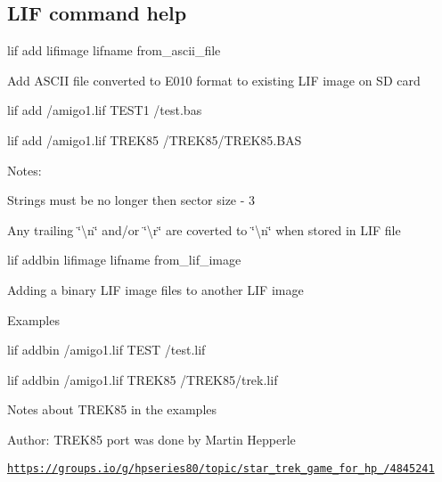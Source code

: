 \subsection*{L\+IF command help}


\begin{DoxyItemize}
\item lif add lifimage lifname from\+\_\+ascii\+\_\+file
\begin{DoxyItemize}
\item Add A\+S\+C\+II file converted to E010 format to existing L\+IF image on SD card
\begin{DoxyItemize}
\item lif add /amigo1.lif T\+E\+S\+T1 /test.bas
\item lif add /amigo1.lif T\+R\+E\+K85 /\+T\+R\+E\+K85/\+T\+R\+E\+K85.B\+AS
\end{DoxyItemize}
\item Notes\+:
\begin{DoxyItemize}
\item Strings must be no longer then sector size -\/ 3
\item Any trailing \char`\"{}\textbackslash{}n\char`\"{} and/or \char`\"{}\textbackslash{}r\char`\"{} are coverted to \char`\"{}\textbackslash{}n\char`\"{} when stored in L\+IF file
\end{DoxyItemize}
\end{DoxyItemize}
\item lif addbin lifimage lifname from\+\_\+lif\+\_\+image
\begin{DoxyItemize}
\item Adding a binary L\+IF image files to another L\+IF image
\item Examples
\begin{DoxyItemize}
\item lif addbin /amigo1.lif T\+E\+ST /test.lif
\item lif addbin /amigo1.lif T\+R\+E\+K85 /\+T\+R\+E\+K85/trek.lif
\end{DoxyItemize}
\item Notes about T\+R\+E\+K85 in the examples
\begin{DoxyItemize}
\item Author\+: T\+R\+E\+K85 port was done by Martin Hepperle
\item \href{https://groups.io/g/hpseries80/topic/star_trek_game_for_hp_85/4845241}{\tt https\+://groups.\+io/g/hpseries80/topic/star\+\_\+trek\+\_\+game\+\_\+for\+\_\+hp\+\_/4845241}
\end{DoxyItemize}

\end{DoxyItemize}
\end{DoxyItemize}

